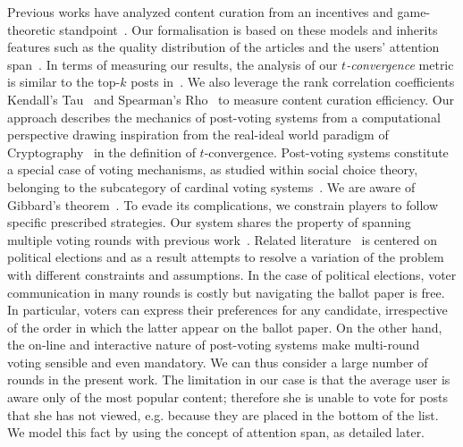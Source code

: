 Previous works have analyzed content curation from an incentives and game-theoretic standpoint~\cite{ghosh2011incentivizing,das2010ranking,gupte2009news,may2014filter,abbassi2014distributed}. Our formalisation is based on these models and inherits features such as the quality distribution of the articles and the users' attention span~\cite{askalidis2013theoretical,ghosh2011incentivizing}. In terms of measuring our results, the analysis of our \textit{$t$-convergence} metric is similar to the top-$k$ posts in~\cite{askalidis2013theoretical}. We also leverage the rank correlation coefficients Kendall's Tau~\cite{kendall1955rank} and Spearman's Rho~\cite{spearman1904proof} to measure content curation efficiency.
Our approach describes the mechanics of post-voting systems from a computational perspective drawing inspiration from the real-ideal world paradigm of Cryptography~\cite{goldreich1999foundations,lindell} in the definition of $t$-convergence.
Post-voting systems constitute a special case of voting mechanisms, as studied within social choice theory, belonging to the subcategory of cardinal voting systems~\cite{hillinger2005case}. We are aware of Gibbard's theorem~\cite{gibbard1973manipulation}. To evade its complications, we constrain players to follow specific prescribed strategies. Our system shares the property of spanning multiple voting rounds with previous work~\cite{kalech2011practical}. Related literature~\cite{lu2011robust,conitzer2005communication,xia2010compilation} is centered on political elections and as a result attempts to resolve a variation of the problem with different constraints and assumptions. In the case of political elections, voter communication in many rounds is costly but navigating the ballot paper is free. In particular, voters can express their preferences for any candidate, irrespective of the order in which the latter appear on the ballot paper. On the other hand, the on-line and interactive nature of post-voting systems make multi-round voting sensible and even mandatory. We can thus consider a large number of rounds in the present work. The limitation in our case is that the average user is aware only of the most popular content; therefore she is unable to vote for posts that she has not viewed, e.g. because they are placed in the bottom of the list. We model this fact by using the concept of attention span, as detailed later.

